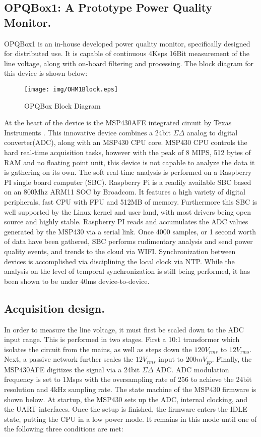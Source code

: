 \subsection{OPQBox1: A Prototype Power Quality Monitor.}

OPQBox1 is an in-house developed power quality monitor, specifically designed for distributed use. It is capable of continuous 4Ksps 16Bit measurement of the line voltage, along with
on-board filtering and processing. The block diagram for this device is shown below:

\begin{figure}[h!]
\centering
\texttt{[image: img/OHM1Block.eps]}
\caption{OPQBox Block Diagram}
\end{figure}

At the heart of the device is the MSP430AFE integrated circuit by Texas Instruments \textregistered. \cite{MSP430AFE} This innovative device combines a 24bit $\Sigma\Delta$ analog to digital converter(ADC), along with an MSP430 CPU core. MSP430 CPU controls the hard real-time acquisition tasks, however with the peak of 8 MIPS, 512 bytes of RAM and no floating point unit, this device is not capable to analyze the data it is gathering on its own. The soft real-time analysis is performed on a Raspberry PI single board computer (SBC). \cite{RaspberryPI} Raspberry Pi is a readily available SBC based on an 800Mhz ARM11 SOC by Broadcom\textregistered. It features a high variety of digital peripherals, fast CPU with FPU and 512MB of memory. Furthermore this SBC is well supported by the Linux kernel and user land, with most drivers being open source and highly stable. Raspberry PI reads and accumulates the ADC values generated by the MSP430 via a serial link. Once 4000 samples, or 1 second worth of data have been gathered, SBC performs rudimentary analysis and send power quality events, and trends to the cloud via WIFI. Synchronization between devices is accomplished via disciplining the local clock via NTP. While the analysis on the level of temporal synchronization is still being performed, it has been shown to be under 40ms device-to-device.

\subsection{Acquisition design.}

In order to measure the line voltage, it must first be scaled down to the ADC input range. This is performed in two stages. First a 10:1 transformer which isolates the circuit from the mains, as well as steps down the $120V_{rms}$ to $12V_{rms}$. Next, a passive network further scales the $12V_{rms}$ input to $200mV_{pp}$. Finally, the MSP430AFE digitizes the signal via a 24bit $\Sigma\Delta$ ADC. ADC modulation frequency is set to 1Msps with the oversampling rate of 256 to achieve the 24bit resolution and 4kHz sampling rate. The state machine of the MSP430 firmware is shown below. At startup, the MSP430 sets up the ADC, internal clocking, and the UART interfaces. Once the setup is finished, the firmware enters the IDLE state, putting the CPU in a low power mode. It remains in this mode until one of the following three conditions are met:

